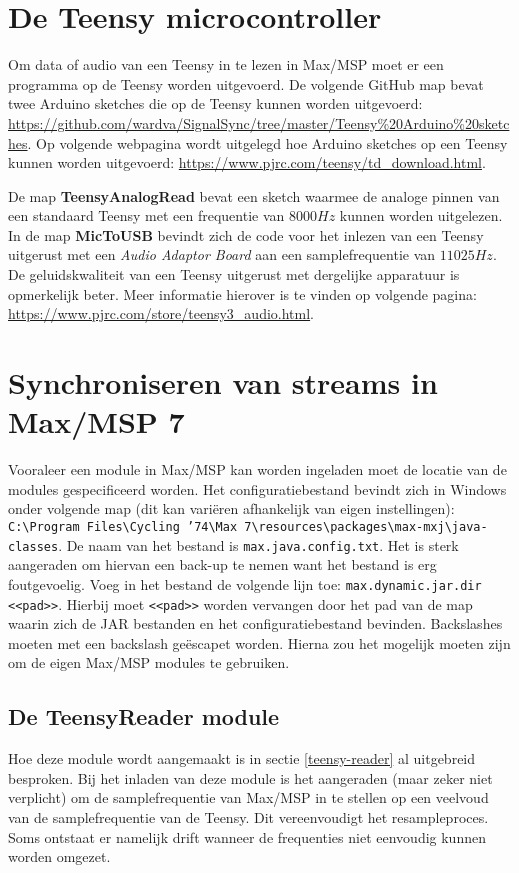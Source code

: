 \section*{De Teensy microcontroller}
\label{read-teensy}

Om data of audio van een Teensy in te lezen in Max/MSP moet er een programma op de Teensy worden uitgevoerd.
De volgende GitHub map bevat twee Arduino sketches die op de Teensy kunnen worden uitgevoerd: \url{https://github.com/wardva/SignalSync/tree/master/Teensy\%20Arduino\%20sketches}. Op volgende webpagina wordt uitgelegd hoe Arduino sketches op een Teensy kunnen worden uitgevoerd: \url{https://www.pjrc.com/teensy/td_download.html}. 

De map \textbf{TeensyAnalogRead} bevat een sketch waarmee de analoge pinnen van een standaard Teensy met een frequentie van $8000Hz$ kunnen worden uitgelezen. In de map \textbf{MicToUSB} bevindt zich de code voor het inlezen van een Teensy uitgerust met een \textit{Audio Adaptor Board} aan een samplefrequentie van $11025Hz$. De geluidskwaliteit van een Teensy uitgerust met dergelijke apparatuur is opmerkelijk beter. Meer informatie hierover is te vinden op volgende pagina: \url{https://www.pjrc.com/store/teensy3_audio.html}.

\section*{Synchroniseren van streams in Max/MSP 7}

Vooraleer een module in Max/MSP kan worden ingeladen moet de locatie van de modules gespecificeerd worden. Het configuratiebestand bevindt zich in Windows onder volgende map (dit kan variëren afhankelijk van eigen instellingen): \texttt{C:\textbackslash Program Files\textbackslash Cycling '74\textbackslash Max 7\textbackslash resources\textbackslash packages\textbackslash max-mxj\textbackslash java-classes}. De naam van het bestand is \texttt{max.java.config.txt}. Het is sterk aangeraden om hiervan een back-up te nemen want het bestand is erg foutgevoelig. Voeg in het bestand de volgende lijn toe: \texttt{max.dynamic.jar.dir <<pad>>}. Hierbij moet \texttt{<<pad>>} worden vervangen door het pad van de map waarin zich de JAR bestanden en het configuratiebestand bevinden. Backslashes moeten met een backslash geëscapet worden. Hierna zou het mogelijk moeten zijn om de eigen Max/MSP modules te gebruiken.

\subsection*{De TeensyReader module}
Hoe deze module wordt aangemaakt is in sectie \ref{teensy-reader} al uitgebreid besproken. Bij het inladen van deze module is het aangeraden (maar zeker niet verplicht) om de samplefrequentie van Max/MSP in te stellen op een veelvoud van de samplefrequentie van de Teensy. Dit vereenvoudigt het resampleproces. Soms ontstaat er namelijk drift wanneer de frequenties niet eenvoudig kunnen worden omgezet.


